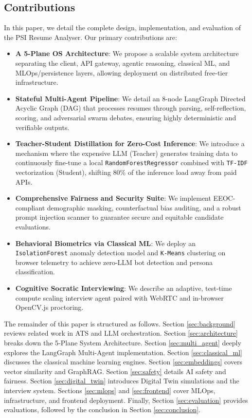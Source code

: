 \subsection{Contributions}
In this paper, we detail the complete design, implementation, and evaluation of the PSI Resume Analyser. Our primary contributions are:
\begin{itemize}
    \item \textbf{A 5-Plane OS Architecture}: We propose a scalable system architecture separating the client, API gateway, agentic reasoning, classical ML, and MLOps/persistence layers, allowing deployment on distributed free-tier infrastructure.
    \item \textbf{Stateful Multi-Agent Pipeline}: We detail an 8-node LangGraph Directed Acyclic Graph (DAG) that processes resumes through parsing, self-reflection, scoring, and adversarial swarm debates, ensuring highly deterministic and verifiable outputs.
    \item \textbf{Teacher-Student Distillation for Zero-Cost Inference}: We introduce a mechanism where the expensive LLM (Teacher) generates training data to continuously fine-tune a local \texttt{RandomForestRegressor} combined with \texttt{TF-IDF} vectorization (Student), shifting 80\% of the inference load away from paid APIs.
    \item \textbf{Comprehensive Fairness and Security Suite}: We implement EEOC-compliant demographic masking, counterfactual bias auditing, and a robust prompt injection scanner to guarantee secure and equitable candidate evaluations.
    \item \textbf{Behavioral Biometrics via Classical ML}: We deploy an \texttt{IsolationForest} anomaly detection model and \texttt{K-Means} clustering on browser telemetry to achieve zero-LLM bot detection and persona classification.
    \item \textbf{Cognitive Socratic Interviewing}: We describe an adaptive, test-time compute scaling interview agent paired with WebRTC and in-browser OpenCV.js proctoring.
\end{itemize}

The remainder of this paper is structured as follows. Section \ref{sec:background} reviews related work in ATS and LLM orchestration. Section \ref{sec:architecture} breaks down the 5-Plane System Architecture. Section \ref{sec:multi_agent} deeply explores the LangGraph Multi-Agent implementation. Section \ref{sec:classical_ml} discusses the classical machine learning engines. Section \ref{sec:embeddings} covers vector similarity and GraphRAG. Section \ref{sec:safety} details AI safety and fairness. Section \ref{sec:digital_twin} introduces Digital Twin simulations and the interview system. Sections \ref{sec:mlops} and \ref{sec:frontend} cover MLOps, infrastructure, and frontend deployment. Finally, Section \ref{sec:evaluation} provides evaluations, followed by the conclusion in Section \ref{sec:conclusion}.
